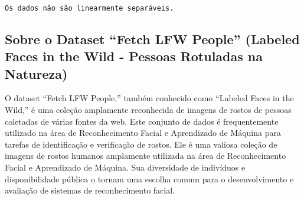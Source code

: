 \documentclass[11pt]{article}
\begin{document}
    \begin{center}
    \end{center}
    { \hspace*{\fill} \\}
    
    \begin{center}
    \end{center}
    { \hspace*{\fill} \\}
    
    \begin{center}
    \end{center}
    { \hspace*{\fill} \\}
    
    \begin{Verbatim}[commandchars=\\\{\}]
Os dados não são linearmente separáveis.
    \end{Verbatim}

    \hypertarget{sobre-o-dataset-fetch-lfw-people-labeled-faces-in-the-wild---pessoas-rotuladas-na-natureza}{%
\subsection{Sobre o Dataset ``Fetch LFW People'' (Labeled Faces in the
Wild - Pessoas Rotuladas na
Natureza)}\label{sobre-o-dataset-fetch-lfw-people-labeled-faces-in-the-wild---pessoas-rotuladas-na-natureza}}

O dataset ``Fetch LFW People,'' também conhecido como ``Labeled Faces in
the Wild,'' é uma coleção amplamente reconhecida de imagens de rostos de
pessoas coletadas de várias fontes da web. Este conjunto de dados é
frequentemente utilizado na área de Reconhecimento Facial e Aprendizado
de Máquina para tarefas de identificação e verificação de rostos. Ele é
uma valiosa coleção de imagens de rostos humanos amplamente utilizada na
área de Reconhecimento Facial e Aprendizado de Máquina. Sua diversidade
de indivíduos e disponibilidade pública o tornam uma escolha comum para
o desenvolvimento e avaliação de sistemas de reconhecimento facial.
\end{document}
